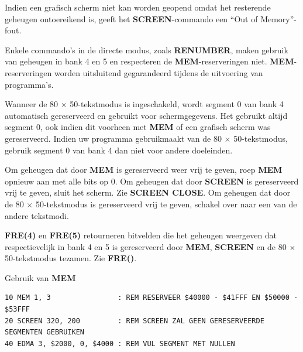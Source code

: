 \begin{description}[leftmargin=2cm,style=nextline]
                  Indien een grafisch scherm niet kan worden geopend omdat het resterende geheugen ontoereikend is, geeft het {\bf SCREEN}-commando een ``Out of Memory''-fout.

                  Enkele commando's in de directe modus, zoals {\bf RENUMBER}, maken gebruik van geheugen in bank 4 en 5 en respecteren de {\bf MEM}-reserveringen niet. {\bf MEM}-reserveringen worden uitsluitend gegarandeerd tijdens de uitvoering van programma's.

                  Wanneer de 80 $\times$ 50-tekstmodus is ingeschakeld, wordt segment 0 van bank 4 automatisch gereserveerd en gebruikt voor schermgegevens. Het gebruikt altijd segment 0, ook indien dit voorheen met {\bf MEM} of een grafisch scherm was gereserveerd. Indien uw programma gebruikmaakt van de 80 $\times$ 50-tekstmodus, gebruik segment 0 van bank 4 dan niet voor andere doeleinden.

                  Om geheugen dat door {\bf MEM} is gereserveerd weer vrij te geven, roep {\bf MEM} opnieuw aan met alle bits op 0. Om geheugen dat door {\bf SCREEN} is gereserveerd vrij te geven, sluit het scherm. Zie {\bf SCREEN CLOSE}. Om geheugen dat door de 80 $\times$ 50-tekstmodus is gereserveerd vrij te geven, schakel over naar een van de andere tekstmodi.

                  {\bf FRE(4)} en {\bf FRE(5)} retourneren bitvelden die het geheugen weergeven dat respectievelijk in bank 4 en 5 is gereserveerd door {\bf MEM}, {\bf SCREEN} en de 80 $\times$ 50-tekstmodus tezamen. Zie {\bf FRE()}.

\item [Voorbeeld:]  Gebruik van {\bf MEM}

\begin{tcolorbox}[colback=black,coltext=white]
\verbatimfont{\codefont}
\begin{verbatim}
10 MEM 1, 3                : REM RESERVEER $40000 - $41FFF EN $50000 - $53FFF
20 SCREEN 320, 200         : REM SCREEN ZAL GEEN GERESERVEERDE SEGMENTEN GEBRUIKEN
40 EDMA 3, $2000, 0, $4000 : REM VUL SEGMENT MET NULLEN
\end{verbatim}
\end{tcolorbox}
\end{description}


\newpage
